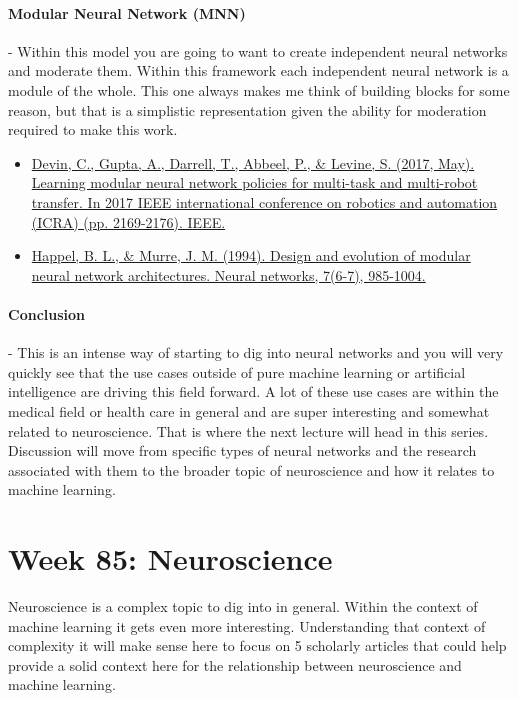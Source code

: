 \documentclass{article}
\begin{document}
\paragraph{Modular Neural Network (MNN)} - Within this model you are going to want to create independent neural networks and moderate them. Within this framework each independent neural network is a module of the whole. This one always makes me think of building blocks for some reason, but that is a simplistic representation given the ability for moderation required to make this work. 

\begin{itemize}
\item \href{https://arxiv.org/pdf/1609.07088.pdf}{Devin, C., Gupta, A., Darrell, T., Abbeel, P., \& Levine, S. (2017, May). Learning modular neural network policies for multi-task and multi-robot transfer. In 2017 IEEE international conference on robotics and automation (ICRA) (pp. 2169-2176). IEEE.} \cite{devin2017learning}
\item \href{https://citeseerx.ist.psu.edu/viewdoc/summary?doi=10.1.1.54.8248}{Happel, B. L., \& Murre, J. M. (1994). Design and evolution of modular neural network architectures. Neural networks, 7(6-7), 985-1004.} \cite{happel1994design}
\end{itemize}

\paragraph{Conclusion} - This is an intense way of starting to dig into neural networks and you will very quickly see that the use cases outside of pure machine learning or artificial intelligence are driving this field forward. A lot of these use cases are within the medical field or health care in general and are super interesting and somewhat related to neuroscience. That is where the next lecture will head in this series. Discussion will move from specific types of neural networks and the research associated with them to the broader topic of neuroscience and how it relates to machine learning. 

\section{Week 85: Neuroscience}
Neuroscience is a complex topic to dig into in general. Within the context of machine learning it gets even more interesting. Understanding that context of complexity it will make sense here to focus on 5 scholarly articles that could help provide a solid context here for the relationship between neuroscience and machine learning. 
\end{document}
